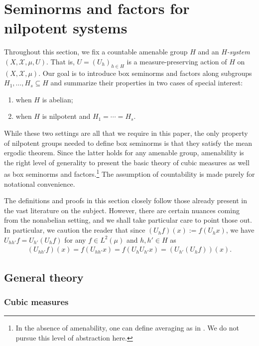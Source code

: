 \documentclass[11pt]{amsart}
\theoremstyle{definition}
\newcommand{\CX}{{\mathcal X}}
\newcommand{\1}{{\mathbf{1}}}
\begin{document}
    \section{Seminorms and factors for nilpotent systems} \label{S: seminorms and factors}
Throughout this section, we fix a countable amenable group $H$ and an \textit{$H$-system} $(X, \CX, \mu, U)$. That is, $U=(U_h)_{h\in H}$ is a measure-preserving action of $H$ on $(X,\CX,\mu)$. Our goal is to introduce box seminorms and factors along subgroups $H_1, \ldots, H_s\subseteq H$ and summarize their properties in two cases of special interest:
\begin{enumerate}
    \item when $H$ is abelian;
    \item when $H$ is nilpotent and $H_1 = \cdots = H_s$.
\end{enumerate}
While these two settings are all that we require in this paper, the only property of nilpotent groups needed to define box seminorms is that they satisfy the mean ergodic theorem. Since the latter holds for any amenable group, amenability is the right level of generality to present the basic theory of cubic measures as well as box seminorms and factors.\footnote{In the absence of amenability, one can define averaging as in \cite[Section 1.4]{TZ16}. We do not pursue this level of abstraction here.} The assumption of countability is made purely for notational convenience.

The definitions and proofs in this section closely follow those already present in the vast literature on the subject. However, there are certain nuances coming from the nonabelian setting, and we shall take particular care to point those out. In particular, we caution the reader that since $(U_hf)(x):=f(U_h x)$, we have $U_{hh'}f = U_{h'}(U_h f)$ for any $f\in L^2(\mu)$ and $h,h'\in H$ as 
\begin{align}\label{E: composition}
(U_{hh'}f)(x)=f(U_{hh'}x) = f(U_h U_{h'}x) = (U_{h'}(U_{h}f))(x). %
\end{align}

\subsection{General theory}\label{SS: general theory}
\subsubsection{Cubic measures}
\end{document}
